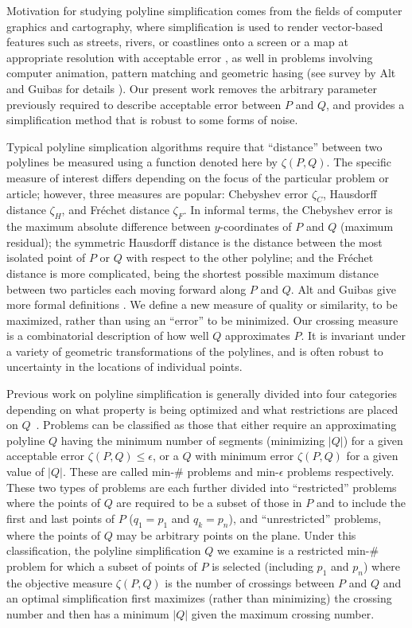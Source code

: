 \documentclass{article}
\begin{document}
Motivation for studying polyline simplification comes from the
fields of computer graphics and cartography, 
where simplification is used to render
vector-based features such as
streets, rivers, or coastlines onto a screen or a map at appropriate
resolution with acceptable error \cite{agarwal:2002},
as well in problems involving computer animation, pattern matching and  
geometric hasing (see survey by Alt and Guibas for details \cite{alt:1999}).
Our present work removes the arbitrary parameter
previously required to describe acceptable error between $P$ and $Q$, and
provides a simplification method that is robust to some forms of noise.

Typical polyline simplication algorithms require that ``distance'' between
two polylines be measured using a function denoted here by $\zeta(P,Q)$. 
The specific measure of interest differs depending on the focus of the
particular problem or article; however, three measures are popular:
Chebyshev error $\zeta_C$, Hausdorff distance $\zeta_H$, and Fr\'{e}chet
distance $\zeta_F$.  In informal terms, the Chebyshev error is the maximum
absolute difference between $y$-coordinates of $P$ and $Q$ (maximum
residual); the symmetric Hausdorff distance is the distance between the most
isolated point of $P$ or $Q$ with respect to the other polyline; and the
Fr\'{e}chet distance is more complicated, being the shortest possible
maximum distance between two particles each moving forward along $P$ and
$Q$.  Alt and Guibas give more formal definitions \cite{alt:1999}.  We define
a new measure of quality or similarity, to be maximized, rather than using
an ``error'' to be minimized.  Our crossing measure is a combinatorial
description of how well $Q$ approximates $P$.  It is invariant under a
variety of geometric transformations of the polylines, and is often robust to
uncertainty in the locations of individual points.

Previous work on polyline simplification is generally divided into
four categories depending on what property
is being optimized and what restrictions
are placed on $Q$~\cite{alt:1999}. Problems can be classified as those
that either
require an approximating polyline $Q$ having the minimum number of segments 
(minimizing $|Q|$) for a
given acceptable error $\zeta(P,Q) \leq\epsilon$, or a $Q$ with minimum
error $\zeta(P,Q)$ for a given value of $|Q|$.  These are called min-$\#$
problems and min-$\epsilon$ problems respectively.  These two types of
problems are each further divided into ``restricted'' problems where the
points of $Q$ are required to be a subset of those in $P$ and to include the
first and last points of $P$ ($q_1 = p_1$ and $q_k = p_n$), 
and ``unrestricted'' problems, where the
points of $Q$ may be arbitrary points on the plane.  Under this classification,
the polyline simplification $Q$ we examine is a restricted min-$\#$ problem
for which a subset of points of $P$ is selected (including $p_1$ and $p_n$)
where the objective measure
$\zeta(P,Q)$ is the number of crossings between $P$ and $Q$ 
and an optimal simplification first
maximizes (rather than minimizing) the crossing number and then has a
minimum $|Q|$ given the maximum crossing number.  
\end{document}
